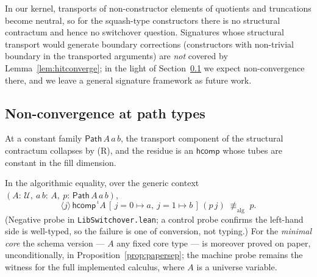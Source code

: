 \documentclass{lmcs}
\newcommand{\hcomp}{\mathsf{hcomp}}
\newcommand{\aconv}{\equiv_{\mathrm{alg}}}
\newcommand{\Path}{\mathsf{Path}}
\newcommand{\U}{\mathcal{U}}
\begin{document}
\noindent In our kernel, transports of non-constructor elements of
quotients and truncations become neutral, so for the squash-type
constructors there is no structural contractum and hence no
switchover question.  Signatures whose structural transport would
generate boundary corrections (constructors with non-trivial boundary
in the transported arguments) are \emph{not} covered by
Lemma~\ref{lem:hitconverge}; in the light of
Section~\ref{sec:nogo} we expect non-convergence there, and we leave
a general signature framework as future work.

\subsection{Non-convergence at path types}
\label{sec:nogo}

At a constant family $\Path\,A\,a\,b$, the transport component of the
structural contractum collapses by (R), and the residue is an
$\hcomp$ whose tubes are constant in the fill dimension.

\begin{lem}\label{lem:pathfail}
  In the algorithmic equality, over the generic context
  $(A{:}\,\U,\ a\,b{:}\,A,\ p{:}\,\Path\,A\,a\,b)$,
  \[
    \langle j \rangle\, \hcomp^{\,\iota} A\,
      [\,j{=}0 \mapsto a,\ j{=}1 \mapsto b\,]\,(p\,j)
    \;\not\aconv\; p.
  \]
  (Negative probe in \texttt{LibSwitchover.lean}; a control probe
  confirms the left-hand side is well-typed, so the failure is one of
  conversion, not typing.)  For the \emph{minimal core} the schema
  version --- $A$ any fixed core type --- is moreover proved on
  paper, unconditionally, in
  Proposition~\ref{prop:papersep}; the machine probe remains the
  witness for the full implemented calculus, where $A$ is a
  universe variable.
\end{lem}
\end{document}
